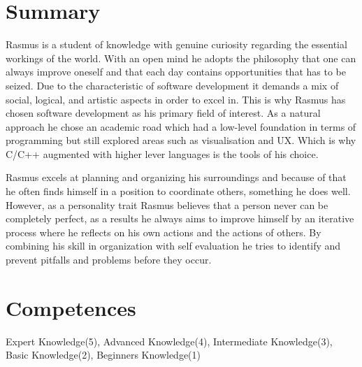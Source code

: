\documentclass[a4paper,10pt]{article}
\begin{document}
\section{Summary}
Rasmus is a student of knowledge with genuine curiosity regarding the essential workings of the world. With an open mind he adopts the philosophy that one can always improve oneself and that each day contains opportunities that has to be seized. Due to the characteristic of software development it demands a mix of social, logical, and artistic aspects in order to excel in. This is why Rasmus has chosen software development as his primary field of interest. As a natural approach he chose an academic road which had a low-level foundation in terms of programming but still explored areas such as visualisation and UX. Which is why C/C++ augmented with higher lever languages is the tools of his choice.

Rasmus excels at planning and organizing his surroundings and because of that he often finds himself in a position to coordinate others, something he does well. However, as a personality trait Rasmus believes that a person never can be completely perfect, as a results he always aims to improve himself by an iterative process where he reflects on his own actions and the actions of others. By combining his skill in organization with self evaluation he tries to identify and prevent pitfalls and problems before they occur.

\section{Competences}
Expert Knowledge(5), Advanced Knowledge(4), Intermediate Knowledge(3), Basic Knowledge(2), Beginners Knowledge(1)
\end{document}
